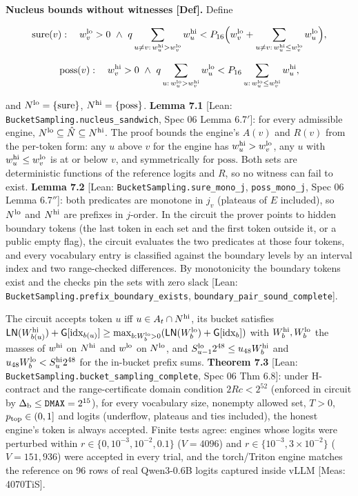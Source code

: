 \documentclass[10pt]{article}
\begin{document}
\textbf{Nucleus bounds without witnesses [Def].} Define

\[\mathrm{sure}(v):\quad w^{\rm lo}_v>0\ \wedge\ q\sum_{u\ne v:\,w^{\rm hi}_u>w^{\rm lo}_v}w^{\rm hi}_u<P_{16}\Big(w^{\rm lo}_v+\sum_{u\ne v:\,w^{\rm hi}_u\le w^{\rm lo}_v}w^{\rm lo}_u\Big),\]

\[\mathrm{poss}(v):\quad w^{\rm hi}_v>0\ \wedge\ q\sum_{u:\,w^{\rm lo}_u>w^{\rm hi}_v}w^{\rm lo}_u<P_{16}\sum_{u:\,w^{\rm lo}_u\le w^{\rm hi}_v}w^{\rm hi}_u,\]

and $N^{\rm lo}=\{\mathrm{sure}\}$, $N^{\rm hi}=\{\mathrm{poss}\}$. \textbf{Lemma 7.1} [Lean: \texttt{BucketSampling.\allowbreak{}nucleus\_\allowbreak{}sandwich}, Spec 06 Lemma 6.7$'$]: for every admissible engine, $N^{\rm lo}\subseteq\hat N\subseteq N^{\rm hi}$. The proof bounds the engine's $A(v)$ and $R(v)$ from the per-token form: any $u$ above $v$ for the engine has $w^{\rm hi}_u>w^{\rm lo}_v$, any $u$ with $w^{\rm hi}_u\le w^{\rm lo}_v$ is at or below $v$, and symmetrically for $\mathrm{poss}$. Both sets are deterministic functions of the reference logits and $R$, so no witness can fail to exist. \textbf{Lemma 7.2} [Lean: \texttt{BucketSampling.\allowbreak{}sure\_\allowbreak{}mono\_\allowbreak{}j}, \texttt{poss\_\allowbreak{}mono\_\allowbreak{}j}, Spec 06 Lemma 6.7$''$]: both predicates are monotone in $j_v$ (plateaus of $E$ included), so $N^{\rm lo}$ and $N^{\rm hi}$ are prefixes in $j$-order. In the circuit the prover points to hidden boundary tokens (the last token in each set and the first token outside it, or a public empty flag), the circuit evaluates the two predicates at those four tokens, and every vocabulary entry is classified against the boundary levels by an interval index and two range-checked differences. By monotonicity the boundary tokens exist and the checks pin the sets with zero slack [Lean: \texttt{BucketSampling.\allowbreak{}prefix\_\allowbreak{}boundary\_\allowbreak{}exists}, \texttt{boundary\_\allowbreak{}pair\_\allowbreak{}sound\_\allowbreak{}complete}].

The circuit accepts token $u$ iff $u\in A_t\cap N^{\rm hi}$, its bucket satisfies $\mathsf{LN}(W^{\rm hi}_{b(u)})+\mathsf G[\mathrm{idx}_{b(u)}]\ge\max_{b:W^{\rm lo}_b>0}(\mathsf{LN}(W^{\rm lo}_b)+\mathsf G[\mathrm{idx}_b])$ with $W^{\rm hi}_b,W^{\rm lo}_b$ the masses of $w^{\rm hi}$ on $N^{\rm hi}$ and $w^{\rm lo}$ on $N^{\rm lo}$, and $S^{\rm lo}_{u-1}2^{48}\le u_{48}W^{\rm hi}_b$ and $u_{48}W^{\rm lo}_b<S^{\rm hi}_u2^{48}$ for the in-bucket prefix sums. \textbf{Theorem 7.3} [Lean: \texttt{BucketSampling.\allowbreak{}bucket\_\allowbreak{}sampling\_\allowbreak{}complete}, Spec 06 Thm 6.8]: under H-contract and the range-certificate domain condition $2Rc<2^{52}$ (enforced in circuit by $\Delta_{\rm b}\le\texttt{DMAX}=2^{15}$), for every vocabulary size, nonempty allowed set, $T>0$, $p_{\rm top}\in(0,1]$ and logits (underflow, plateaus and ties included), the honest engine's token is always accepted. Finite tests agree: engines whose logits were perturbed within $r\in\{0,10^{-3},10^{-2},0.1\}$ ($V=4096$) and $r\in\{10^{-3},3\times10^{-2}\}$ ($V=151{,}936$) were accepted in every trial, and the torch/Triton engine matches the reference on 96 rows of real Qwen3-0.6B logits captured inside vLLM [Meas: 4070TiS].
\end{document}
